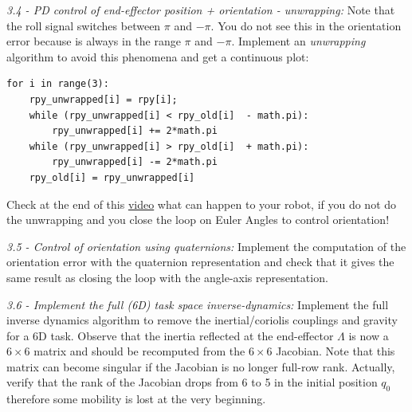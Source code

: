 \documentclass[11pt]{article}
\begin{document}
\textit{3.4 - PD control of end-effector position + orientation - unwrapping:}
Note that the roll signal switches between $\pi$ and $-\pi$. You do not see this in the orientation error because is always in the range $\pi$ and $-\pi$. Implement an \textit{unwrapping} algorithm to avoid this phenomena and get a continuous plot:

\begin{verbatim}
for i in range(3):
    rpy_unwrapped[i] = rpy[i];
    while (rpy_unwrapped[i] < rpy_old[i]  - math.pi):
        rpy_unwrapped[i] += 2*math.pi
    while (rpy_unwrapped[i] > rpy_old[i]  + math.pi):  
        rpy_unwrapped[i] -= 2*math.pi
    rpy_old[i] = rpy_unwrapped[i] 	
\end{verbatim}

Check at the end of this \href{https://youtu.be/sax0QzG8qAw }{video} what can happen to your robot, if you do not do the unwrapping and you close the loop on Euler Angles to control orientation! 


\quad

\noindent
\textit{3.5 - Control of orientation using quaternions:}
Implement the computation of the orientation error with the 
quaternion representation and check that it gives the same result as closing the loop with the angle-axis representation. 

\quad
 
\noindent
\textit{3.6 - Implement the full (6D) task space inverse-dynamics:}
Implement the full inverse dynamics algorithm to remove the inertial/coriolis couplings and gravity for a 6D task.
Observe that the inertia reflected at the end-effector $\Lambda$ is now a $6\times6$ matrix and should be recomputed from the $6\times6$ Jacobian. Note that this matrix 
can become singular if the Jacobian is no longer full-row rank. 
Actually, verify that the rank of the Jacobian drops from 6 to 5 in the initial position $q_0$ therefore some mobility is lost 
at the very beginning.
\end{document}
